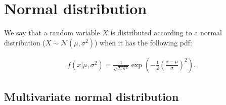 \section{Normal distribution}\label{sec:normal-distribution}

We say that a random variable $X$ is distributed
according to a normal distribution ($X \sim \mathcal{N}(\mu, \sigma^2)$) when it has the following \gls{pdf}:

\begin{definition}
	\begin{align}
		\label{eq:pdf_normal_dist}
		f(x|\mu, \sigma^2) = \frac{1}{\sqrt{2\pi\sigma^2}}
		\exp{\left(-\frac{1}{2}\left(\frac{x-\mu}{\sigma}\right)^2\right)}.
	\end{align}
\end{definition}

\subsection{Multivariate normal distribution}\label{subsec:multivariate-normal-distribution}

